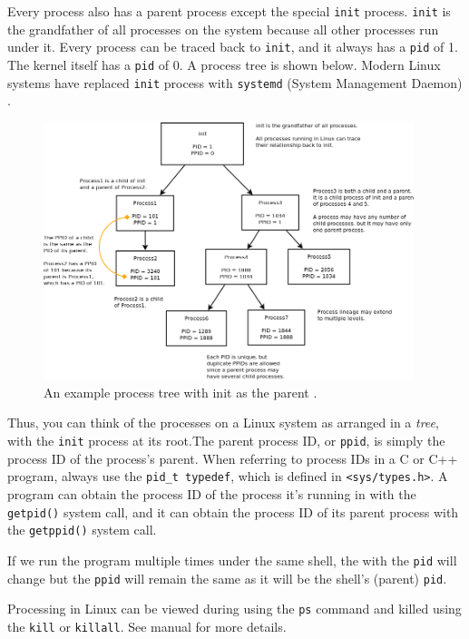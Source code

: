 \documentclass[a4paper]{article}
\begin{document}
Every process also has a parent process except the special \texttt{init} process. \texttt{init} is the grandfather of all processes on the system because all other processes run under it. Every process can be traced back to \texttt{init}, and it always has a \texttt{pid} of 1. The kernel itself has a \texttt{pid} of 0. A process tree is shown below. Modern Linux systems have replaced \texttt{init} process with \texttt{systemd} (System Management Daemon) \cite{webdelight}. 
\begin{figure}[H]
    \centering
    \includegraphics[height=7.5cm]{img/pid_tree.png}
    \caption{An example process tree with init as the parent \cite{webdelight}.}
\end{figure}

Thus, you can think of the processes on a Linux
system as arranged in a \textit{tree}, with the \texttt{init} process at its root.The parent process ID, or \texttt{ppid}, is simply the process ID of the process’s parent.
When referring to process IDs in a C or C++ program, always use the \texttt{pid\_t
typedef}, which is defined in \texttt{<sys/types.h>}. A program can obtain the process ID of
the process it’s running in with the \texttt{getpid()} system call, and it can obtain the process
ID of its parent process with the \texttt{getppid()} system call.


If we run the program multiple times under the same shell, the with the \texttt{pid}  will change but the \texttt{ppid} will remain the same as it will be the shell's (parent) \texttt{pid}.

Processing in Linux can be viewed during using the \texttt{ps} command and killed using the \texttt{kill} or \texttt{killall}. See manual for more details.
\end{document}

